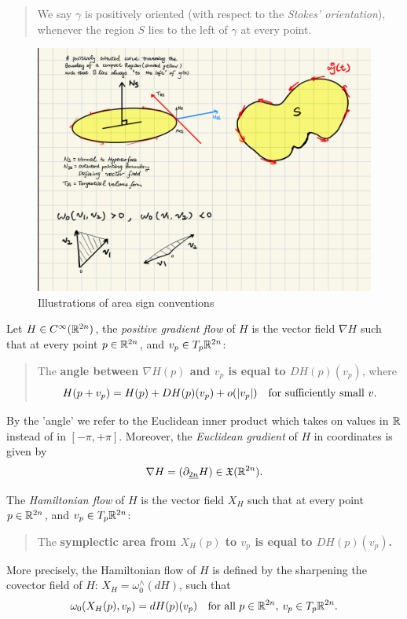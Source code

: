 \documentclass[../main-v2-manifolds.tex]{subfiles}
\begin{document}
\begin{quote}
We say $\gamma$ is positively oriented (with respect to the \emph{Stokes' orientation}), whenever the region $S$ lies to the left of $\gamma$ at every point.
\end{quote}
\begin{figure}[h!]
    \centering
    \includegraphics[width=0.5\linewidth]{images/positive-area-opens-to-left-sketch.png}
    \caption{Illustrations of area sign conventions}
    \label{fig:area sign conventions}
\end{figure}
\begin{remark}\label{rmk:gradient flow}
Let $H\in C^\infty({\mathbb{R}^{2n}})$, the \emph{positive gradient flow} of $H$ is the vector field $\nabla H$ such that at every point $p\in {\mathbb{R}^{2n}}$, and $v_p\in T_p {\mathbb{R}^{2n}}$:
\begin{quote}
    The \textbf{angle between $\nabla{H}(p)$ and $v_p$ is equal to $DH(p)(v_p)$}, where
    \begin{equation}
    H(p+v_p) = H(p) + DH(p)(v_p) + o(\vert {v_p} \vert)\quad\text{for sufficiently small }v.
    \label{eq:Frechet Derivative as best possible linear approximation}
\end{equation}
\end{quote}
By the 'angle' we refer to the Euclidean inner product which takes on values in $\mathbb{R}$ instead of in $[-\pi, +\pi]$. Moreover, the \emph{Euclidean gradient} of $H$ in coordinates is given by
\[\nabla H = (\partial_{\underline{2n}}H)\in\mathfrak{X}({\mathbb{R}^{2n}}).\]
\end{remark}
\begin{definition}
    The \emph{Hamiltonian flow} of $H$ is the vector field $X_H$ such that at every point $p\in {\mathbb{R}^{2n}}$, and $v_p\in T_p{\mathbb{R}^{2n}}$:
    \begin{quote}
        The \textbf{symplectic area from $X_H(p)$ to $v_p$ is equal to $DH(p)(v_p)$.}
    \end{quote}
    More precisely, the Hamiltonian flow of $H$ is defined by the sharpening the covector field of $H$:  $X_H = \omega_0^{\wedge}(dH)$, such that
    \begin{equation}
        \omega_0(X_H(p), v_p) = dH(p)(v_p)\quad\text{for all }p\in {\mathbb{R}^{2n}},\: v_p\in T_p{\mathbb{R}^{2n}}.
        \label{eq:hamiltonian flow definition symplectic pairing}
    \end{equation}
\end{definition}
\end{document}
